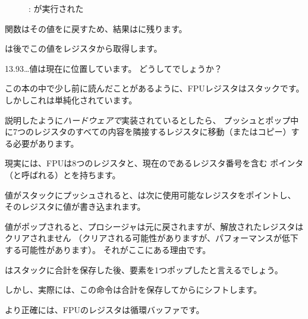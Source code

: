 \begin{figure}[H]
\centering
{}
\caption{\olly: \FADDP が実行された}
\label{fig:FPU_simple_olly_5}
\end{figure}

関数はその値をに戻すため、結果はに残ります。

\main は後でこの値をレジスタから取得します。

13.93\ldots 値は現在に位置しています。
どうしてでしょうか？

\label{FPU_is_rather_circular_buffer}

この本の中で少し前に読んだことがあるように、\ac{FPU}レジスタはスタックです。
しかしこれは単純化されています。

説明したように\emph{ハードウェアで}実装されているとしたら、
プッシュとポップ中に7つのレジスタのすべての内容を隣接するレジスタに移動（またはコピー）する必要があります。

現実には、\ac{FPU}は8つのレジスタと、現在のであるレジスタ番号を含む
ポインタ（と呼ばれる）とを持ちます。

値がスタックにプッシュされると、は次に使用可能なレジスタをポイントし、
そのレジスタに値が書き込まれます。

値がポップされると、プロシージャは元に戻されますが、解放されたレジスタはクリアされません
（クリアされる可能性がありますが、パフォーマンスが低下する可能性があります）。
それがここにある理由です。

\FADDP はスタックに合計を保存した後、要素を1つポップしたと言えるでしょう。

しかし、実際には、この命令は合計を保存してからにシフトします。

より正確には、\ac{FPU}のレジスタは循環バッファです。

